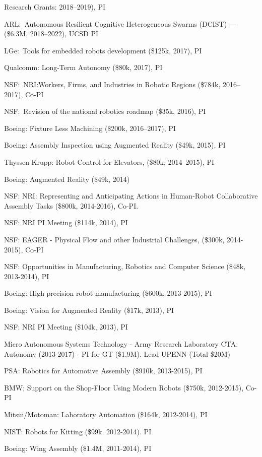 \documentclass{article}
\begin{document}
\begin{cv}
\begin{cvlist}{Research Grants:}
		2018--2019), PI
		\item ARL:\ Autonomous Resilient Cognitive Heterogeneous Swarms
		(DCIST) --- (\$6.3M, 2018--2022), UCSD PI
		\item LGe:\ Tools for embedded robots development (\$125k, 2017), PI
		\item Qualcomm: Long-Term Autonomy (\$80k, 2017), PI
		\item NSF:\ NRI:Workers, Firms, and Industries in Robotic Regions
		(\$784k, 2016--2017), Co-PI
		\item NSF:\ Revision of the national robotics roadmap (\$35k, 2016), PI
		\item Boeing: Fixture Less Machining (\$200k, 2016--2017), PI
		\item Boeing: Assembly Inspection using Augmented Reality (\$49k,
		2015), PI
		\item Thyssen Krupp: Robot Control for Elevators, (\$80k, 2014--2015), PI
		\item Boeing: Augmented Reality (\$49k, 2014)
		\item NSF: NRI: Representing and Anticipating Actions in Human-Robot
		Collaborative Assembly Tasks (\$800k, 2014-2016), Co-PI.
		\item NSF: NRI PI Meeting (\$114k, 2014), PI
		\item NSF: EAGER - Physical Flow and other Industrial Challenges,
		(\$300k, 2014-2015), Co-PI
		\item NSF: Opportunities in Manufacturing, Robotics and Computer Science
		(\$48k, 2013-2014), PI
		\item Boeing: High precision robot manufacturing (\$600k, 2013-2015), PI
		\item Boeing: Vision for Augmented Reality (\$17k, 2013), PI
		\item NSF: NRI PI Meeting (\$104k, 2013), PI
		\item Micro Autonomous Systems Technology - Army Research Laboratory
		CTA: Autonomy (2013-2017) - PI for GT (\$1.9M). Lead UPENN (Total
		\$20M) %
		\item PSA: Robotics for Automotive Assembly (\$910k, 2013-2015), PI
		\item BMW; Support on the Shop-Floor Using Modern Robots (\$750k,
		2012-2015), Co-PI
		\item Mitsui/Motoman: Laboratory Automation (\$164k, 2012-2014), PI
		\item NIST: Robots for Kitting (\$99k. 2012-2014). PI
		\item Boeing: Wing Assembly (\$1.4M, 2011-2014), PI

\end{cvlist}
\end{cv}
\end{document}
